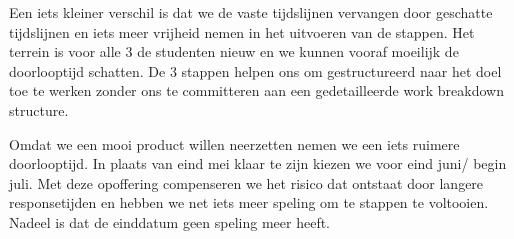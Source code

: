 \begin{description}
\begin{aanpassing1}
Een iets kleiner verschil is dat we de vaste tijdslijnen vervangen door geschatte tijdslijnen en 
iets meer vrijheid nemen in het uitvoeren van de stappen. Het terrein is voor alle 3 de studenten 
nieuw en we kunnen vooraf moeilijk de doorlooptijd schatten. De 3 stappen helpen ons om gestructureerd 
naar het doel toe te werken zonder ons te committeren aan een gedetailleerde work breakdown structure.

Omdat we een mooi product willen neerzetten nemen we een iets ruimere doorlooptijd. In plaats van 
eind mei klaar te zijn kiezen we voor eind juni/ begin juli. Met deze opoffering compenseren we het risico
dat ontstaat door langere responsetijden en hebben we net iets meer speling om te stappen te voltooien.
Nadeel is dat de einddatum geen speling meer heeft.
\end{aanpassing1}

\end{description}